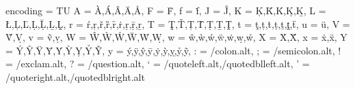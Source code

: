 \XeTeXinterchartoks \chara \charb {\kern0.01ex}
\XeTeXinterchartoks \charb \chark {\kern-0.05ex}
\XeTeXinterchartoks \chari \charz {\kern0.05ex}
\XeTeXinterchartoks \charn \charn {\kern-0.1ex}
\XeTeXinterchartoks \charp \chara {\kern0.0125ex}

\XeTeXinterchartoks \charD \chary {\kern0.1ex}

\XeTeXinterchartoks \charJ \charr {\kern-0.1ex}

\XeTeXinterchartoks \charV \charb {\kern0.1ex}
\XeTeXinterchartoks \charV \charg {\kern-0.2ex}
\XeTeXinterchartoks \charV \charn {\kern-0.2ex}

\XeTeXinterchartoks \charZ \chara {\kern0.075ex}

\XeTeXinterchartoks \charf \charKzg {\kern1pt}

\XeTeXinterchartoks \charKzg \chark {\nobreak\hskip-0.25pt\relax}
\XeTeXinterchartoks \charKzg \charn {\nobreak\hskip-0.5pt\relax}
\XeTeXinterchartoks \charKzg \charo {\nobreak\hskip-0.3pt\relax}
\XeTeXinterchartoks \charKzg \charu {\nobreak\hskip-0.5pt\relax}

\DeclareCharacterInheritance
   { encoding = {TU} }
   { A = {À,Á,Â,Ä,Å},
     F = {Ḟ},
     f = {ḟ},
     J = {Ĵ},
     K = {Ķ,Ǩ,Ḱ,Ḳ,Ḵ},
     L = {Ł,Ļ,Ľ,Ḷ,Ḹ,Ḻ,Ḽ},
     r = {ŕ,ŗ,ř,ȑ,ȓ,ṙ,ṛ,ṝ,ṟ},
     T = {Ţ,Ť,Ț,Ṫ,Ṭ,Ṯ,Ṱ},
     t = {ţ,ț,ṫ,ṭ,ṯ,ṱ,ẗ},
     u = {ü},
     V = {Ṽ,Ṿ},
     v = {ṽ,ṿ},
     W = {Ŵ,Ẁ,Ẃ,Ẅ,Ẇ,Ẉ},
     w = {ŵ,ẁ,ẃ,ẅ,ẇ,ẉ,ẘ},
     X = {Ẋ,Ẍ},
     x = {ẋ,ẍ},
     Y = {Ý,Ŷ,Ÿ,Ȳ,Ẏ,Ỳ,Ỵ,Ỷ,Ỹ},
     y = {ý,ÿ,ŷ,ȳ,ẏ,ỳ,ỵ,ỷ,ỹ},
     : = {/colon.alt},
     ; = {/semicolon.alt},
     ! = {/exclam.alt},
     ? = {/question.alt},
     ‘ = {/quoteleft.alt,/quotedblleft.alt},
     ’ = {/quoteright.alt,/quotedblright.alt}
   }

